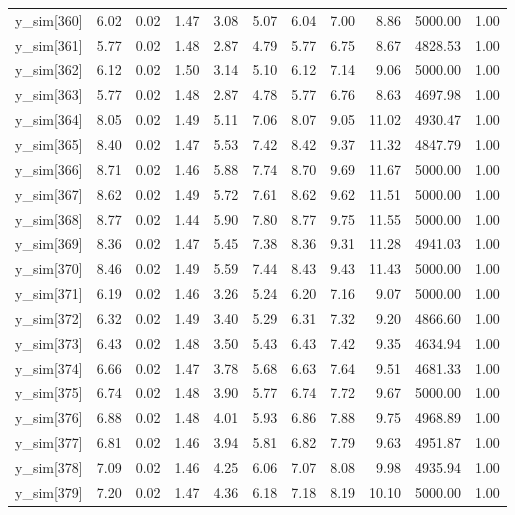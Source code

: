 \begin{table}[ht]
\begin{tabular}{rrrrrrrrrrr}
  y\_sim[360] & 6.02 & 0.02 & 1.47 & 3.08 & 5.07 & 6.04 & 7.00 & 8.86 & 5000.00 & 1.00 \\ 
  y\_sim[361] & 5.77 & 0.02 & 1.48 & 2.87 & 4.79 & 5.77 & 6.75 & 8.67 & 4828.53 & 1.00 \\ 
  y\_sim[362] & 6.12 & 0.02 & 1.50 & 3.14 & 5.10 & 6.12 & 7.14 & 9.06 & 5000.00 & 1.00 \\ 
  y\_sim[363] & 5.77 & 0.02 & 1.48 & 2.87 & 4.78 & 5.77 & 6.76 & 8.63 & 4697.98 & 1.00 \\ 
  y\_sim[364] & 8.05 & 0.02 & 1.49 & 5.11 & 7.06 & 8.07 & 9.05 & 11.02 & 4930.47 & 1.00 \\ 
  y\_sim[365] & 8.40 & 0.02 & 1.47 & 5.53 & 7.42 & 8.42 & 9.37 & 11.32 & 4847.79 & 1.00 \\ 
  y\_sim[366] & 8.71 & 0.02 & 1.46 & 5.88 & 7.74 & 8.70 & 9.69 & 11.67 & 5000.00 & 1.00 \\ 
  y\_sim[367] & 8.62 & 0.02 & 1.49 & 5.72 & 7.61 & 8.62 & 9.62 & 11.51 & 5000.00 & 1.00 \\ 
  y\_sim[368] & 8.77 & 0.02 & 1.44 & 5.90 & 7.80 & 8.77 & 9.75 & 11.55 & 5000.00 & 1.00 \\ 
  y\_sim[369] & 8.36 & 0.02 & 1.47 & 5.45 & 7.38 & 8.36 & 9.31 & 11.28 & 4941.03 & 1.00 \\ 
  y\_sim[370] & 8.46 & 0.02 & 1.49 & 5.59 & 7.44 & 8.43 & 9.43 & 11.43 & 5000.00 & 1.00 \\ 
  y\_sim[371] & 6.19 & 0.02 & 1.46 & 3.26 & 5.24 & 6.20 & 7.16 & 9.07 & 5000.00 & 1.00 \\ 
  y\_sim[372] & 6.32 & 0.02 & 1.49 & 3.40 & 5.29 & 6.31 & 7.32 & 9.20 & 4866.60 & 1.00 \\ 
  y\_sim[373] & 6.43 & 0.02 & 1.48 & 3.50 & 5.43 & 6.43 & 7.42 & 9.35 & 4634.94 & 1.00 \\ 
  y\_sim[374] & 6.66 & 0.02 & 1.47 & 3.78 & 5.68 & 6.63 & 7.64 & 9.51 & 4681.33 & 1.00 \\ 
  y\_sim[375] & 6.74 & 0.02 & 1.48 & 3.90 & 5.77 & 6.74 & 7.72 & 9.67 & 5000.00 & 1.00 \\ 
  y\_sim[376] & 6.88 & 0.02 & 1.48 & 4.01 & 5.93 & 6.86 & 7.88 & 9.75 & 4968.89 & 1.00 \\ 
  y\_sim[377] & 6.81 & 0.02 & 1.46 & 3.94 & 5.81 & 6.82 & 7.79 & 9.63 & 4951.87 & 1.00 \\ 
  y\_sim[378] & 7.09 & 0.02 & 1.46 & 4.25 & 6.06 & 7.07 & 8.08 & 9.98 & 4935.94 & 1.00 \\ 
  y\_sim[379] & 7.20 & 0.02 & 1.47 & 4.36 & 6.18 & 7.18 & 8.19 & 10.10 & 5000.00 & 1.00 \\ 

\end{tabular}
\end{table}
